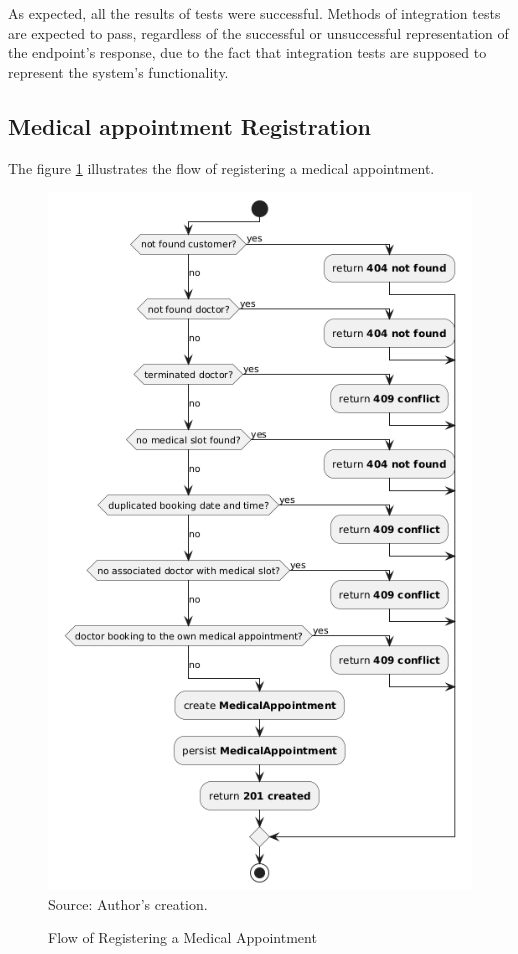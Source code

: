 As expected, all the results of tests were successful. Methods of integration tests are expected to pass, regardless of the successful or unsuccessful representation of the endpoint's response, due to the fact that integration tests are supposed to represent the system's functionality.

\newpage

\subsection{Medical appointment Registration}

The figure \ref{fig:medical_appointment_registration_activity_diagram} illustrates the flow of registering a medical appointment.

\begin{figure}[H]
	\centering
	\caption{Flow of Registering a Medical Appointment}
	\includegraphics[width=0.6\linewidth]{figures/medical_appointment_registration_activity_diagram.PNG}
	\\ \footnotesize Source: Author's creation.
	\label{fig:medical_appointment_registration_activity_diagram}
\end{figure}

